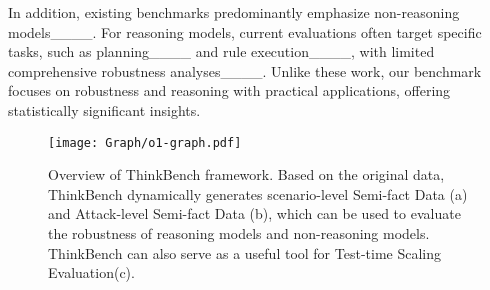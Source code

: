 

In addition, existing benchmarks predominantly emphasize non-reasoning models____.
For reasoning models, current evaluations often target specific tasks, such as planning____ and rule execution____, with limited comprehensive robustness analyses____. Unlike these work, our benchmark focuses on robustness and reasoning with practical applications, offering statistically significant insights.

\begin{figure*}[t]
    \centering
    \texttt{[image: Graph/o1-graph.pdf]}
    \caption{Overview of ThinkBench framework. Based on the original data, ThinkBench dynamically generates scenario-level Semi-fact Data (a) and Attack-level Semi-fact Data (b), which can be used to evaluate the robustness of reasoning models and non-reasoning models. ThinkBench can also serve as a useful tool for Test-time Scaling Evaluation(c). 
    }
    \label{fig:framework}
\end{figure*}

